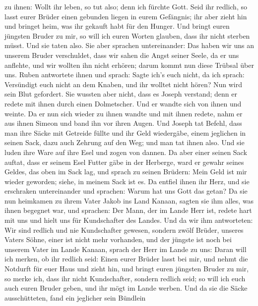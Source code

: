 zu ihnen: Wollt ihr leben, so tut also; denn ich fürchte Gott.
 Seid ihr redlich, so lasst eurer Brüder einen gebunden
liegen in eurem Gefängnis; ihr aber zieht hin und bringet heim, was ihr
gekauft habt für den Hunger.  Und bringt euren jüngsten
Bruder zu mir, so will ich euren Worten glauben, dass ihr nicht sterben
müsst. Und sie taten also.  Sie aber sprachen
untereinander: Das haben wir uns an unserem Bruder verschuldet, dass wir
sahen die Angst seiner Seele, da er uns anflehte, und wir wollten ihn
nicht erhören; darum kommt nun diese Trübsal über uns. 
Ruben antwortete ihnen und sprach: Sagte ich's euch nicht, da ich
sprach: Versündigt euch nicht an dem Knaben, und ihr wolltet nicht
hören? Nun wird sein Blut gefordert.  Sie wussten aber
nicht, dass es Joseph verstand; denn er redete mit ihnen durch einen
Dolmetscher.  Und er wandte sich von ihnen und weinte. Da
er nun sich wieder zu ihnen wandte und mit ihnen redete, nahm er aus
ihnen Simeon und band ihn vor ihren Augen.  Und Joseph
tat Befehl, dass man ihre Säcke mit Getreide füllte und ihr Geld
wiedergäbe, einem jeglichen in seinen Sack, dazu auch Zehrung auf den
Weg; und man tat ihnen also.  Und sie luden ihre Ware auf
ihre Esel und zogen von dannen.  Da aber einer seinen
Sack auftat, dass er seinem Esel Futter gäbe in der Herberge, ward er
gewahr seines Geldes, das oben im Sack lag,  und sprach
zu seinen Brüdern: Mein Geld ist mir wieder geworden; siehe, in meinem
Sack ist es. Da entfiel ihnen ihr Herz, und sie erschraken untereinander
und sprachen: Warum hat uns Gott das getan?  Da sie nun
heimkamen zu ihrem Vater Jakob ins Land Kanaan, sagten sie ihm alles,
was ihnen begegnet war, und sprachen:  Der Mann, der im
Lande Herr ist, redete hart mit uns und hielt uns für Kundschafter des
Landes.  Und da wir ihm antworteten: Wir sind redlich und
nie Kundschafter gewesen,  sondern zwölf Brüder, unseres
Vaters Söhne, einer ist nicht mehr vorhanden, und der jüngste ist noch
bei unserem Vater im Lande Kanaan,  sprach der Herr im
Lande zu uns: Daran will ich merken, ob ihr redlich seid: Einen eurer
Brüder lasst bei mir, und nehmt die Notdurft für euer Haus und zieht
hin,  und bringt euren jüngsten Bruder zu mir, so merke
ich, dass ihr nicht Kundschafter, sondern redlich seid; so will ich euch
auch euren Bruder geben, und ihr mögt im Lande werben. 
Und da sie die Säcke ausschütteten, fand ein jeglicher sein Bündlein

